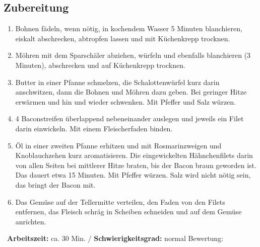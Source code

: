 \begin{minipage}[t]{0.58\textwidth}
\vspace{0pt}
\subsection*{Zubereitung}
\begin{enumerate}[leftmargin=*, itemindent=14pt]
\item Bohnen fädeln, wenn nötig, in kochendem Wasser 5 Minuten blanchieren, eiskalt abschrecken, abtropfen lassen und mit Küchenkrepp trocknen.

\item Möhren mit dem Sparschäler abziehen, würfeln und ebenfalls blanchieren (3 Minuten), abschrecken und auf Küchenkrepp trocknen.

\item Butter in einer Pfanne schmelzen, die Schalottenwürfel kurz darin anschwitzen, dann die Bohnen und Möhren dazu geben. Bei geringer Hitze erwärmen und hin und wieder schwenken. Mit Pfeffer und Salz würzen. 

\item 4 Baconstreifen überlappend nebeneinander auslegen und jeweils ein Filet darin einwickeln. Mit einem Fleischerfaden binden. 

\item Öl in einer zweiten Pfanne erhitzen und mit Rosmarinzweigen und Knoblauchzehen kurz aromatisieren. Die eingewickelten Hähnchenfilets darin von allen Seiten bei mittlerer Hitze braten, bis der Bacon braun geworden ist. Das dauert etwa 15 Minuten. Mit Pfeffer würzen. Salz wird nicht nötig sein, das bringt der Bacon mit.

\item Das Gemüse auf der Tellermitte verteilen, den Faden von den Filets entfernen, das Fleisch schräg in Scheiben schneiden und auf dem Gemüse anrichten.
\end{enumerate}
\end{minipage}
\vfill
\decothreeright \, \textbf{Arbeitszeit:} ca. 30 Min. / \textbf{Schwierigkeitsgrad:} normal \decothreeleft \hfill Bewertung:  \Circle  \Circle \Circle \Circle \Circle